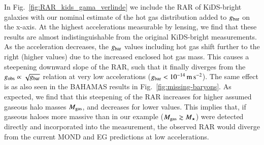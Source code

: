\documentclass{aa}
\newcommand{\mpss}{\,{\rm m}\,{\rm s}^{-2} }
\newcommand{\un}[1]{_{\rm #1}}
\begin{document}
In Fig.~\ref{fig:RAR_kids_gama_verlinde} we include the RAR of KiDS-bright galaxies with our nominal estimate of the hot gas distribution added to $g\un{bar}$ on the x-axis. At the highest accelerations measurable by lensing, we find that these results are almost indistinguishable from the original KiDS-bright measurements. As the acceleration decreases, the $g\un{bar}$ values including hot gas shift further to the right (higher values) due to the increased enclosed hot gas mass. This causes a steepening downward slope of the RAR, such that it finally diverges from the $g\un{obs} \propto \sqrt{g\un{bar}}$ relation at very low accelerations ($g\un{bar}<10^{-14} \mpss$). The same effect is as also seen in the BAHAMAS results in Fig.~\ref{fig:missing-baryons}. As expected, we find that this steepening of the RAR increases for higher assumed gaseous halo masses $M\un{gas}$, and decreases for lower values. This implies that, if gaseous haloes more massive than in our example ($M\un{gas} \gtrsim M_\star$) were detected directly and incorporated into the measurement, the observed RAR would diverge from the current MOND and EG predictions at low accelerations.
\end{document}
